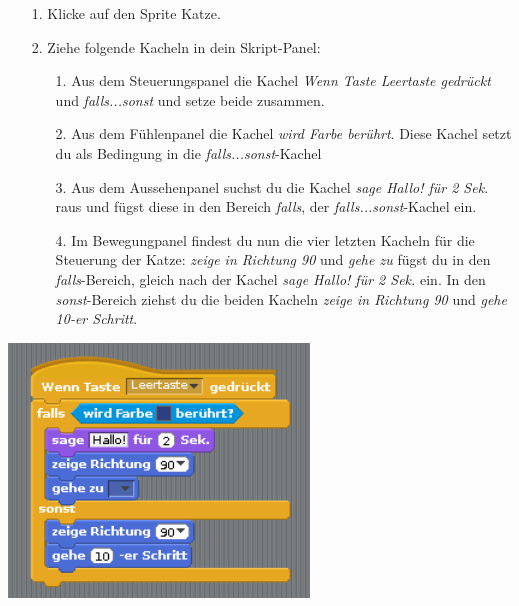 \begin{itemize}
\item[1. ] Klicke auf den Sprite Katze.
\item[2. ] Ziehe folgende Kacheln in dein Skript-Panel:
  \begin{itemize}
  \item[1. ] Aus dem Steuerungspanel die Kachel \textit{Wenn Taste Leertaste gedrückt} und \textit{falls...sonst} und setze beide zusammen.
  \item[2. ] Aus dem Fühlenpanel die Kachel \textit{wird Farbe berührt}. Diese Kachel setzt du als Bedingung in die \textit{falls...sonst}-Kachel
  \item[3. ] Aus dem Aussehenpanel suchst du die Kachel \textit{sage Hallo! für 2 Sek.} raus und fügst diese in den Bereich \textit{falls}, der \textit{falls...sonst}-Kachel ein.
  \item[4. ] Im Bewegungpanel findest du nun die vier letzten Kacheln für die Steuerung der Katze: \textit{zeige in Richtung 90} und \textit{gehe zu} fügst du in den \textit{falls}-Bereich, gleich nach der Kachel \textit{sage Hallo! für 2 Sek.} ein. In den \textit{sonst}-Bereich ziehst du die beiden Kacheln \textit{zeige in Richtung 90} und \textit{gehe 10-er Schritt}.
  \end{itemize}
\end{itemize}
\includegraphics[width=0.6\textwidth]{images/aufgabe4_katze_bewegung_default.png}
